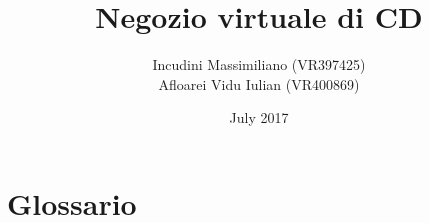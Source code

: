 \documentclass{ieeelike}
\title{Negozio virtuale di CD}
\author{Incudini Massimiliano (VR397425) \\ Afloarei Vidu Iulian (VR400869)}
\date{July 2017}
\begin{document}
\maketitle
\tableofcontents







\chapter{Glossario}
\glsaddall
\printglossary
\end{document}
